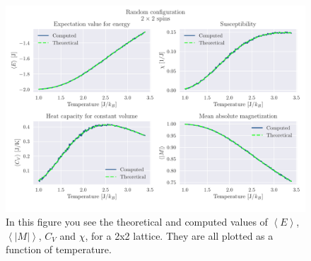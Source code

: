\documentclass[reprint, english,notitlepage,nofootinbib]{revtex4-1}  %
\begin{document}
\begin{figure}[!htb]
	\includegraphics[width=\linewidth]{../output/c/L2-T1-dT0_01-NT240-N5-RandomFalse_comp.pdf}
	\caption{In this figure you see the theoretical and computed values of $\left<E\right>$, $\left<|M|\right>$, $C_V$ and $\chi$, for a 2x2 lattice. They are all plotted as a function of temperature.}
	\label{fig:L2_Random}
\end{figure}
\end{document}
